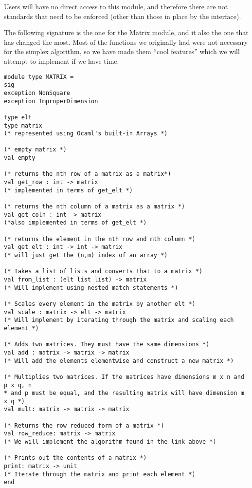 \documentclass[letterpaper,11pt]{article}
\begin{document}
Users will have no direct access to this module, and therefore there are not
standards that need to be enforced (other than those in place by the interface).

The following signature is the one for the Matrix module, and it also the one
that has changed the most. Most of the functions we originally had were not
necessary for the simplex algorithm, so we have made them ``cool features''
which we will attempt to implement if we have time.

\begin{verbatim}
module type MATRIX =
sig
exception NonSquare
exception ImproperDimension

type elt
type matrix
(* represented using Ocaml's built-in Arrays *)

(* empty matrix *)
val empty

(* returns the nth row of a matrix as a matrix*)
val get_row : int -> matrix
(* implemented in terms of get_elt *)

(* returns the nth column of a matrix as a matrix *)
val get_coln : int -> matrix
(*also implemented in terms of get_elt *)

(* returns the element in the nth row and mth column *)
val get_elt : int -> int -> matrix 
(* will just get the (n,m) index of an array *)

(* Takes a list of lists and converts that to a matrix *)
val from_list : (elt list list) -> matrix
(* Will implement using nested match statements *)

(* Scales every element in the matrix by another elt *)
val scale : matrix -> elt -> matrix
(* Will implement by iterating through the matrix and scaling each element *)

(* Adds two matrices. They must have the same dimensions *)
val add : matrix -> matrix -> matrix
(* Will add the elements elementwise and construct a new matrix *)

(* Multiplies two matrices. If the matrices have dimensions m x n and p x q, n
* and p must be equal, and the resulting matrix will have dimension m x q *)
val mult: matrix -> matrix -> matrix

(* Returns the row reduced form of a matrix *)
val row_reduce: matrix -> matrix
(* We will implement the algorithm found in the link above *)

(* Prints out the contents of a matrix *)
print: matrix -> unit
(* Iterate through the matrix and print each element *)
end
\end{verbatim}
\end{document}
